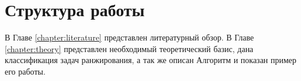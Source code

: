 \section*{Структура работы}
В Главе \ref{chapter:literature} представлен литературный обзор. В Главе \ref{chapter:theory} представлен необходимый теоретический базис, дана классификация задач ранжирования, а так же описан Алгоритм и показан пример его работы.
